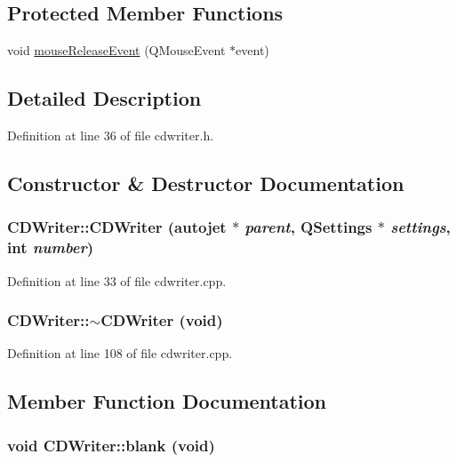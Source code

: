 \subsection*{Protected Member Functions}
\begin{CompactItemize}
\item 
void \hyperlink{classCDWriter_712e2295621dccbe6866a3b539a8006c}{mouseReleaseEvent} (QMouseEvent $\ast$event)
\end{CompactItemize}


\subsection{Detailed Description}


Definition at line 36 of file cdwriter.h.

\subsection{Constructor \& Destructor Documentation}
\hypertarget{classCDWriter_44fe78fc3cfdb9c9cc0a427686141ade}{
\subsubsection[{CDWriter}]{\setlength{\rightskip}{0pt plus 5cm}CDWriter::CDWriter ({\bf autojet} $\ast$ {\em parent}, \/  QSettings $\ast$ {\em settings}, \/  int {\em number})}}
\label{classCDWriter_44fe78fc3cfdb9c9cc0a427686141ade}




Definition at line 33 of file cdwriter.cpp.\hypertarget{classCDWriter_072733059c989992f725774bee5331b7}{
\subsubsection[{$\sim$CDWriter}]{\setlength{\rightskip}{0pt plus 5cm}CDWriter::$\sim$CDWriter (void)}}
\label{classCDWriter_072733059c989992f725774bee5331b7}




Definition at line 108 of file cdwriter.cpp.

\subsection{Member Function Documentation}
\hypertarget{classCDWriter_74d2e90422414e44485b258b5be222d8}{
\subsubsection[{blank}]{\setlength{\rightskip}{0pt plus 5cm}void CDWriter::blank (void)}}
\label{classCDWriter_74d2e90422414e44485b258b5be222d8}




